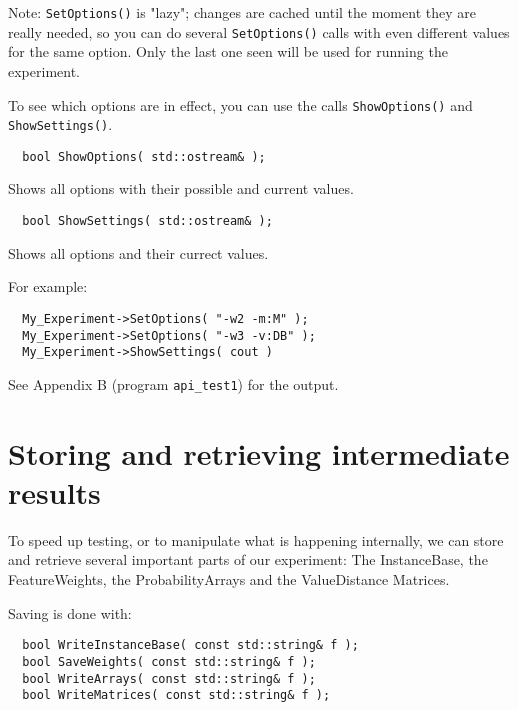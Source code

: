 \documentclass{report}
\begin{document}
Note: {\tt SetOptions()} is "lazy"; changes are cached until the
moment they are really needed, so you can do several {\tt SetOptions()}
calls with even different values for the same option. Only the last
one seen will be used for running the experiment.

To see which options are in effect, you can use the calls {\tt ShowOptions()}
and {\tt ShowSettings()}.

\begin{footnotesize}
\begin{verbatim}
  bool ShowOptions( std::ostream& );
\end{verbatim}
\end{footnotesize}

Shows all options with their possible and current values.

\begin{footnotesize}
\begin{verbatim}
  bool ShowSettings( std::ostream& );
\end{verbatim}
\end{footnotesize}

Shows all options and their currect values.

For example:

\begin{footnotesize}
\begin{verbatim}
  My_Experiment->SetOptions( "-w2 -m:M" );
  My_Experiment->SetOptions( "-w3 -v:DB" );
  My_Experiment->ShowSettings( cout )
\end{verbatim}
\end{footnotesize}

See Appendix B (program {\tt api\_test1}) for the output.

\section{Storing and retrieving intermediate results}

To speed up testing, or to manipulate what is happening internally, we
can store and retrieve several important parts of our experiment: The
InstanceBase, the FeatureWeights, the ProbabilityArrays and the ValueDistance Matrices.

Saving is done with:

\begin{footnotesize}
\begin{verbatim}
  bool WriteInstanceBase( const std::string& f );
  bool SaveWeights( const std::string& f );
  bool WriteArrays( const std::string& f );
  bool WriteMatrices( const std::string& f );
\end{verbatim}
\end{footnotesize}
\end{document}

